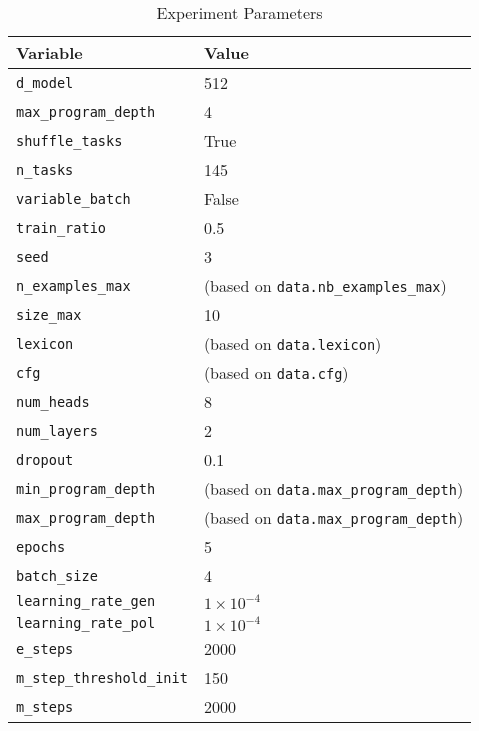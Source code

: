     \begin{table}[ht]
        \centering
        \caption{Experiment Parameters}
        \begin{tabular}{|l|l|}
        \hline
        \textbf{Variable} & \textbf{Value} \\
        \hline
        \texttt{d\_model} & 512 \\
        \hline
        \texttt{max\_program\_depth} & 4 \\
        \hline
        \texttt{shuffle\_tasks} & True \\
        \hline
        \texttt{n\_tasks} & 145 \\
        \hline
        \texttt{variable\_batch} & False \\
        \hline
        \texttt{train\_ratio} & 0.5 \\
        \hline
        \texttt{seed} & 3 \\
        \hline
        \texttt{n\_examples\_max} & (based on \texttt{data.nb\_examples\_max}) \\
        \hline
        \texttt{size\_max} & 10 \\
        \hline
        \texttt{lexicon} & (based on \texttt{data.lexicon}) \\
        \hline
        \texttt{cfg} & (based on \texttt{data.cfg}) \\
        \hline
        \texttt{num\_heads} & 8 \\
        \hline
        \texttt{num\_layers} & 2 \\
        \hline
        \texttt{dropout} & 0.1 \\
        \hline
        \texttt{min\_program\_depth} & (based on \texttt{data.max\_program\_depth}) \\
        \hline
        \texttt{max\_program\_depth} & (based on \texttt{data.max\_program\_depth}) \\
        \hline
        \texttt{epochs} & 5 \\
        \hline
        \texttt{batch\_size} & 4 \\
        \hline
        \texttt{learning\_rate\_gen} & $1 \times 10^{-4}$ \\
        \hline
        \texttt{learning\_rate\_pol} & $1 \times 10^{-4}$ \\
        \hline
        \texttt{e\_steps} & 2000 \\
        \hline
        \texttt{m\_step\_threshold\_init} & 150 \\
        \hline
        \texttt{m\_steps} & 2000 \\

\end{tabular}
\end{table}
